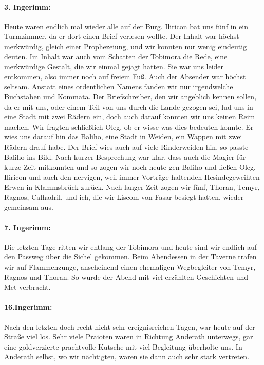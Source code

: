 \documentclass[11pt]{scrreprt}
\begin{document}
\paragraph{3. Ingerimm:} Heute waren endlich mal wieder alle auf der Burg. Iliricon bat uns fünf in ein Turmzimmer, da er dort einen Brief verlesen wollte. Der Inhalt war höchst merkwürdig, gleich einer Prophezeiung, und wir konnten nur wenig eindeutig deuten. Im Inhalt war auch vom Schatten der Tobimora die Rede, eine merkwürdige Gestalt, die wir einmal gejagt hatten. Sie war uns leider entkommen, also immer noch auf freiem Fuß. Auch der Absender war höchst seltsam. Anstatt eines ordentlichen Namens fanden wir nur irgendwelche Buchstaben und Kommata. Der Briefschreiber, den wir angeblich kennen sollen, da er mit uns, oder einem Teil von uns durch die Lande gezogen sei, lud uns in eine Stadt mit zwei Rädern ein, doch auch darauf konnten wir uns keinen Reim machen. Wir fragten schließlich Oleg, ob er wisse was dies bedeuten konnte. Er wies uns darauf hin das Baliho, eine Stadt in Weiden, ein Wappen mit zwei Rädern drauf habe. Der Brief wies auch auf viele Rinderweiden hin, so passte Baliho ins Bild. Nach kurzer Besprechung war klar, dass auch die Magier für kurze Zeit mitkonnten und so zogen wir noch heute gen Baliho und ließen Oleg, Iliricon und auch den nervigen, weil immer Vorträge haltenden Hesindegeweihten Erwen in Klammsbrück zurück. Nach langer Zeit zogen wir fünf, Thoran, Temyr, Ragnos, Calhadril, und ich, die wir Liscom von Fasar besiegt hatten, wieder gemeinsam aus.

\paragraph{7. Ingerimm:}
Die letzten Tage ritten wir entlang der Tobimora und heute sind wir endlich auf den Passweg über die Sichel gekommen. Beim Abendessen in der Taverne trafen wir auf Flammenzunge, anscheinend einen ehemaligen Wegbegleiter von Temyr, Ragnos und Thoran. So wurde der Abend mit viel erzählten Geschichten und Met verbracht.

\paragraph{16.Ingerimm:}
Nach den letzten doch recht nicht sehr ereignisreichen Tagen, war heute auf der Straße viel los. Sehr viele Praioten waren in Richtung Anderath unterwegs, gar eine goldverzierte prachtvolle Kutsche mit viel Begleitung überholte uns. In Anderath selbst, wo wir nächtigten, waren sie dann auch sehr stark vertreten.
\end{document}
